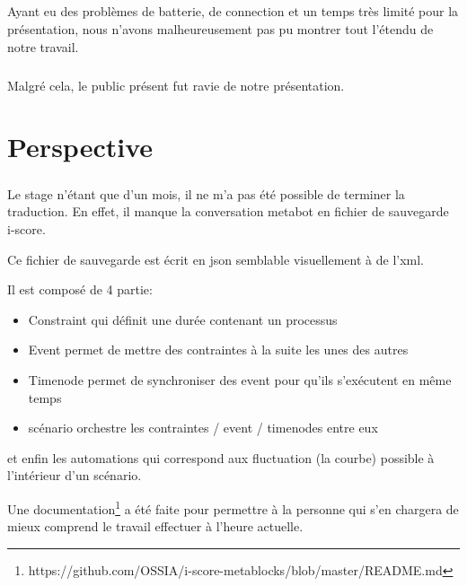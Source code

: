 \documentclass[10pt,a4paper]{report}
\begin{document}
\paragraph{}
Ayant eu des problèmes de batterie, de connection et un temps très limité pour la présentation, nous n'avons malheureusement pas pu montrer tout l'étendu de notre travail.
\paragraph{}
Malgré cela, le public présent fut ravie de notre présentation.

\paragraph{}
\chapter{Perspective}
\paragraph{}
Le stage n'étant que d'un mois, il ne m'a pas été possible de terminer la traduction. En effet, il manque la conversation metabot en fichier de sauvegarde i-score.

Ce fichier de sauvegarde est écrit en \acrfull{json} semblable visuellement à de l'xml.

Il est composé de 4 partie:
\begin{itemize}
\item Constraint qui définit une durée contenant un processus
\item Event permet de mettre des contraintes à la suite les unes des autres
\item Timenode permet de synchroniser des event pour qu'ils s'exécutent en même temps
\item scénario orchestre les contraintes / event / timenodes entre eux
\end{itemize}
et enfin les automations qui correspond aux fluctuation (la courbe) possible à l'intérieur d'un scénario.

Une documentation\footnote{https://github.com/OSSIA/i-score-metablocks/blob/master/README.md} a été faite pour permettre à la personne qui s'en chargera de mieux comprend le travail effectuer à l'heure actuelle.


\def\appendixpage{\vspace*{8cm} 
\begin{center} 
\Huge\textbf{Annexes} 
\end{center} 
} 
\def\appendixname{Annexe}%
\end{document}
